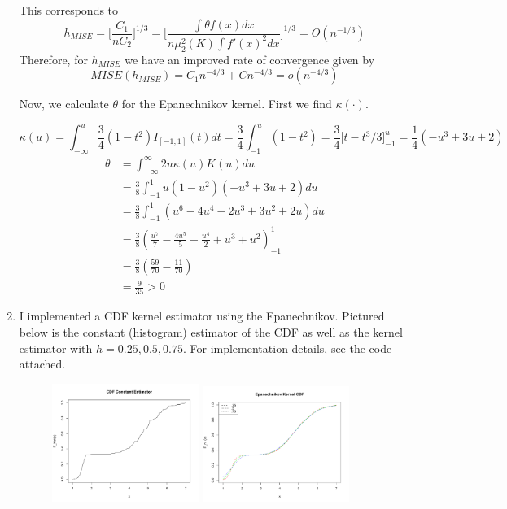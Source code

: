 \documentclass[12pt]{article}  %
\begin{document}
\begin{enumerate}
This corresponds to $$h_{MISE} = \Big[\frac{C_1}{nC_2}\Big]^{1/3} =  \Big[\frac{\int \theta f(x)dx}{n\mu_2^{2}(K)\int f'(x)^2dx}\Big]^{1/3} = O(n^{-1/3})$$
Therefore, for $h_{MISE}$ we have an improved rate of convergence given by $$MISE(h_{MISE}) = C_1 n^{-4/3} + Cn^{-4/3} = o(n^{-4/3})$$

Now, we calculate $\theta$ for the Epanechnikov kernel. First we find $\kappa(\cdot)$. 

$$\kappa(u) = \int_{-\infty}^{u}\frac{3}{4}(1-t^2)I_{[-1,1]}(t)dt= \frac{3}{4}\int_{-1}^{u}(1-t^2) = \frac{3}{4}\Big[t-t^3/3\Big]_{-1}^{u} = \frac{1}{4}(-u^3 + 3u + 2)$$
\begin{align*}
\theta &= \int_{-\infty}^{\infty} 2u\kappa(u)K(u)du\\
&= \frac{3}{8}\int_{-1}^{1}u(1-u^2)(-u^3 +3u+2)du\\
&=\frac{3}{8}\int_{-1}^{1}(u^6 -4u^4 -2u^3 + 3u^2 +2u)du\\
&= \frac{3}{8}\left(\frac{u^7}{7}-\frac{4u^5}{5}-\frac{u^4}{2}+u^3 + u^2\right)_{-1}^{1}\\
&= \frac{3}{8}\left(\frac{59}{70} - \frac{11}{70}\right)\\
&= \frac{9}{35}>0
\end{align*}


\item I implemented a CDF kernel estimator using the Epanechnikov. Pictured below is the constant (histogram) estimator of the CDF as well as the kernel estimator with $h =0.25, 0.5, 0.75$.  For implementation details, see the code attached. 


\begin{figure}[h]
\centering
\includegraphics[width = 0.45\textwidth]{p4.pdf}
\includegraphics[width = 0.45\textwidth]{p3.pdf}
\end{figure}

\end{enumerate}
\end{document}
